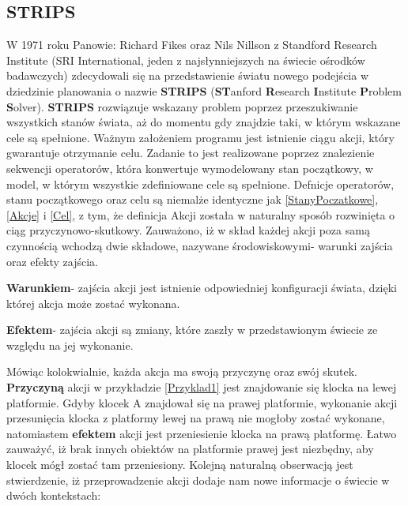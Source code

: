     \subsection{STRIPS}
    W 1971 roku Panowie: Richard Fikes oraz Nils Nillson z Standford Research Institute (SRI International, 
    jeden z najsłynniejszych na świecie ośrodków badawczych) zdecydowali się na przedstawienie światu
    nowego podejścia w dziedzinie planowania o nazwie \textbf{STRIPS} (\textbf{ST}anford \textbf{R}esearch \textbf{I}nstitute
    \textbf{P}roblem \textbf{S}olver)\cite{STRIPS}.
    \textbf{STRIPS} rozwiązuje wskazany problem poprzez przeszukiwanie wszystkich stanów świata, aż do momentu
    gdy znajdzie taki, w którym wskazane cele są spełnione. Ważnym założeniem programu jest istnienie
    ciągu akcji, który gwarantuje otrzymanie celu. Zadanie to jest realizowane poprzez znalezienie
    sekwencji operatorów, która konwertuje wymodelowany stan początkowy, w model, w którym wszystkie 
    zdefiniowane cele są spełnione. Defnicje operatorów, stanu początkowego oraz celu są niemalże identyczne jak 
    \ref{StanyPoczatkowe}, \ref{Akcje} i \ref{Cel}, z tym, że definicja Akcji została w naturalny sposób rozwinięta o ciąg przyczynowo-skutkowy. Zauważono, iż w skład każdej akcji 
    poza samą czynnością wchodzą dwie składowe, nazywane środowiskowymi- warunki zajścia oraz efekty zajścia. 
    \begin{definition}
        \label{WarunekAkcji}
        \textbf{Warunkiem}- zajścia akcji jest istnienie odpowiedniej konfiguracji świata, dzięki której akcja może zostać wykonana.
    \end{definition}
    \begin{definition}
        \label{EfektAkcji}
        \textbf{Efektem}- zajścia akcji są zmiany, które zaszły w przedstawionym świecie ze względu na jej wykonanie.
    \end{definition}
    Mówiąc kolokwialnie, każda akcja ma swoją przyczynę oraz swój skutek. \textbf{Przyczyną} akcji w przykładzie \ref{Przyklad1} jest znajdowanie się klocka na lewej platformie. Gdyby
    klocek A znajdował się na prawej platformie, wykonanie akcji przesunięcia klocka z platformy lewej na prawą nie mogłoby zostać wykonane, natomiastem \textbf{efektem} akcji jest 
    przeniesienie klocka na prawą platformę. Łatwo zauważyć, iż brak innych obiektów na platformie prawej jest niezbędny, aby klocek mógł zostać tam przeniesiony.
    Kolejną naturalną obserwacją jest stwierdzenie, iż przeprowadzenie akcji dodaje nam nowe informacje o świecie w dwóch kontekstach:
